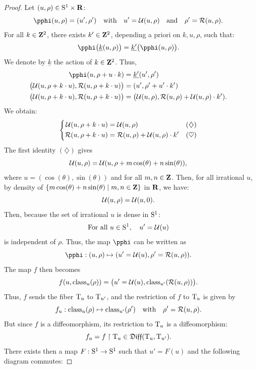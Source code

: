 \begin{proof}
  Let $(u,\rho) \in \mathrm{S}^1 \times \mathbf{R}$:
  $$%
    \pphi(u,\rho) = (u',\rho')
    \quad \text{with} \quad
    u' = \cU(u,\rho)
    \quad \text{and} \quad
    \rho' = \cR(u,\rho).
    $$%
  For all $k \in \mathbf{Z}^2$,
  there exists $k' \in \mathbf{Z}^2$,
  depending a priori on $k, u, \rho$, such that:
  $$%
    \pphi\big(\underline{k}(u,\rho)\big) = \underline{k'}\big(\pphi(u,\rho)\big).
    $$%
  We denote by $\underline{k}$ the action of $k \in \mathbf{Z}^2$.
  Thus,
  \begin{align*}
    \pphi(u, \rho + u \cdot k) & = \underline{k'}(u',\rho') \\
    \big(\cU(u,\rho + k \cdot u), \cR(u,\rho + k \cdot u)\big) & = (u', \rho' + u' \cdot k') \\
    \big(\cU(u,\rho + k \cdot u), \cR(u,\rho + k \cdot u)\big) & = \big(\cU(u,\rho), \cR(u,\rho) + \cU(u,\rho) \cdot k').
  \end{align*}
  We obtain:
  $$%
    \left\{
    \begin{aligned}
    \cU(u,\rho + k \cdot u) & =  \cU(u,\rho) \hfill & (\diamondsuit) \\
    \cR(u,\rho + k \cdot u) & =  \cR(u,\rho) + \cU(u,\rho) \cdot k' & (\heartsuit)
    \end{aligned}
    \right.
    $$%
  The first identity $(\diamondsuit)$ gives
  $$%
    \cU(u,\rho) = \cU(u, \rho + m \cos(\theta) + n \sin(\theta)),
    $$%
  where $u = (\cos(\theta), \sin(\theta))$ and for all $m,n \in \mathbf{Z}$.
  Then,
  for all irrational $u$,
  by density of $\{m \cos(\theta) + n \sin(\theta) \mid m,n \in \mathbf{Z}\}$ in $\mathbf{R}$,
  we have:
  $$%
    \cU(u,\rho) = \cU(u,0).
    $$%
  Then,
  because the set of irrational $u$ is dense in $\mathrm{S}^1$:
  $$%
    \text{For all } u \in \Sph^1, \quad u' = \cU(u)
    $$%
  is independent of $\rho$.
  Thus,
  the map $\pphi$ can be written as
  $$%
    \pphi : (u,\rho) \mapsto (u' = \cU(u), \rho' = \cR(u,\rho)).
    $$%
  The map $f$ then becomes
  $$%
    f(u, \Class_u(\rho)) = \big(u' = \cU(u), \Class_{u'}(\cR(u,\rho))\big).
    $$%
  Thus,
  $f$ sends the fiber $\mathrm{T}_u$ to $\mathrm{T}_{u'}$,
  and the restriction of $f$ to $\mathrm{T}_u$ is given by
  $$%
    f_u : \Class_u(\rho) \mapsto \Class_{u'}(\rho')
    \quad \text{with} \quad
    \rho' = \cR(u,\rho).
    $$%
  But since $f$ is a diffeomorphism,
  its restriction to $\mathrm{T}_u$ is a diffeomorphism:
  $$%
    f_u = f \restriction \Torus_u \in \Diff(\Torus_u, \Torus_{u'}).
    $$%
  There exists then a map $F : \mathrm{S}^1 \to \mathrm{S}^1$ such that $u' = F(u)$ and the following diagram commutes:
  

\end{proof}
